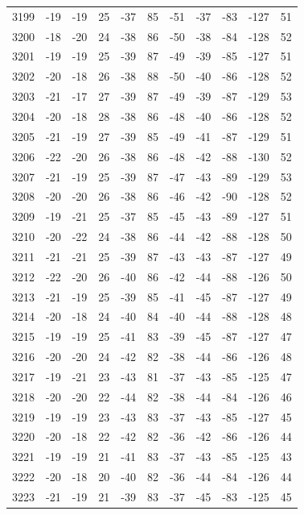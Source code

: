 \begin{table}[H]
\begin{tabular}{lllllllllll}
3199 & -19 & -19 & 25 & -37 & 85 & -51 & -37 & -83 & -127 & 51 \\
3200 & -18 & -20 & 24 & -38 & 86 & -50 & -38 & -84 & -128 & 52 \\
3201 & -19 & -19 & 25 & -39 & 87 & -49 & -39 & -85 & -127 & 51 \\
3202 & -20 & -18 & 26 & -38 & 88 & -50 & -40 & -86 & -128 & 52 \\
3203 & -21 & -17 & 27 & -39 & 87 & -49 & -39 & -87 & -129 & 53 \\
3204 & -20 & -18 & 28 & -38 & 86 & -48 & -40 & -86 & -128 & 52 \\
3205 & -21 & -19 & 27 & -39 & 85 & -49 & -41 & -87 & -129 & 51 \\
3206 & -22 & -20 & 26 & -38 & 86 & -48 & -42 & -88 & -130 & 52 \\
3207 & -21 & -19 & 25 & -39 & 87 & -47 & -43 & -89 & -129 & 53 \\
3208 & -20 & -20 & 26 & -38 & 86 & -46 & -42 & -90 & -128 & 52 \\
3209 & -19 & -21 & 25 & -37 & 85 & -45 & -43 & -89 & -127 & 51 \\
3210 & -20 & -22 & 24 & -38 & 86 & -44 & -42 & -88 & -128 & 50 \\
3211 & -21 & -21 & 25 & -39 & 87 & -43 & -43 & -87 & -127 & 49 \\
3212 & -22 & -20 & 26 & -40 & 86 & -42 & -44 & -88 & -126 & 50 \\
3213 & -21 & -19 & 25 & -39 & 85 & -41 & -45 & -87 & -127 & 49 \\
3214 & -20 & -18 & 24 & -40 & 84 & -40 & -44 & -88 & -128 & 48 \\
3215 & -19 & -19 & 25 & -41 & 83 & -39 & -45 & -87 & -127 & 47 \\
3216 & -20 & -20 & 24 & -42 & 82 & -38 & -44 & -86 & -126 & 48 \\
3217 & -19 & -21 & 23 & -43 & 81 & -37 & -43 & -85 & -125 & 47 \\
3218 & -20 & -20 & 22 & -44 & 82 & -38 & -44 & -84 & -126 & 46 \\
3219 & -19 & -19 & 23 & -43 & 83 & -37 & -43 & -85 & -127 & 45 \\
3220 & -20 & -18 & 22 & -42 & 82 & -36 & -42 & -86 & -126 & 44 \\
3221 & -19 & -19 & 21 & -41 & 83 & -37 & -43 & -85 & -125 & 43 \\
3222 & -20 & -18 & 20 & -40 & 82 & -36 & -44 & -84 & -126 & 44 \\
3223 & -21 & -19 & 21 & -39 & 83 & -37 & -45 & -83 & -125 & 45 \\

\end{tabular}
\end{table}
